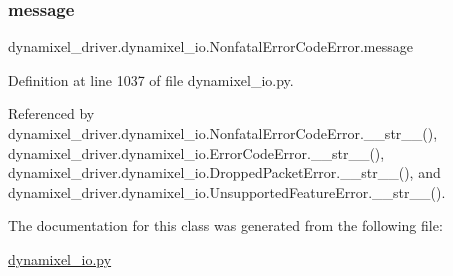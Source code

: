 \subsubsection{\texorpdfstring{message}{message}}
{\footnotesize\ttfamily dynamixel\+\_\+driver.\+dynamixel\+\_\+io.\+Nonfatal\+Error\+Code\+Error.\+message}



Definition at line 1037 of file dynamixel\+\_\+io.\+py.



Referenced by dynamixel\+\_\+driver.\+dynamixel\+\_\+io.\+Nonfatal\+Error\+Code\+Error.\+\_\+\+\_\+str\+\_\+\+\_\+(), dynamixel\+\_\+driver.\+dynamixel\+\_\+io.\+Error\+Code\+Error.\+\_\+\+\_\+str\+\_\+\+\_\+(), dynamixel\+\_\+driver.\+dynamixel\+\_\+io.\+Dropped\+Packet\+Error.\+\_\+\+\_\+str\+\_\+\+\_\+(), and dynamixel\+\_\+driver.\+dynamixel\+\_\+io.\+Unsupported\+Feature\+Error.\+\_\+\+\_\+str\+\_\+\+\_\+().



The documentation for this class was generated from the following file\+:\begin{DoxyCompactItemize}
\item 
\hyperlink{dynamixel__io_8py}{dynamixel\+\_\+io.\+py}\end{DoxyCompactItemize}
